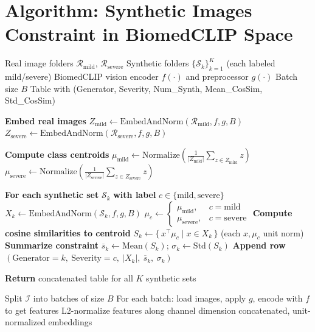 \documentclass[10pt]{article}
\begin{document}
\section*{Algorithm: Synthetic Images Constraint in BiomedCLIP Space}

\begin{algorithm}[H]
\caption{Compute class–centroid cosine similarity statistics (constraint)}
\begin{small}
\begin{algorithmic}[1]
\Require Real image folders $\mathcal{R}_{\text{mild}}$, $\mathcal{R}_{\text{severe}}$
\Require Synthetic folders $\{\mathcal{S}_k\}_{k=1}^K$ (each labeled mild/severe)
\Require BiomedCLIP vision encoder $f(\cdot)$ and preprocessor $g(\cdot)$
\Require Batch size $B$
\Ensure Table with (Generator, Severity, Num\_Synth, Mean\_CosSim, Std\_CosSim)

\State \textbf{Embed real images}
\State $Z_{\text{mild}} \gets \text{EmbedAndNorm}(\mathcal{R}_{\text{mild}}, f, g, B)$
\State $Z_{\text{severe}} \gets \text{EmbedAndNorm}(\mathcal{R}_{\text{severe}}, f, g, B)$

\State \textbf{Compute class centroids}
\State $\mu_{\text{mild}} \gets \text{Normalize}\!\left(\frac{1}{|Z_{\text{mild}}|}\sum_{z \in Z_{\text{mild}}} z\right)$
\State $\mu_{\text{severe}} \gets \text{Normalize}\!\left(\frac{1}{|Z_{\text{severe}}|}\sum_{z \in Z_{\text{severe}}} z\right)$

\State \textbf{For each synthetic set} $\mathcal{S}_k$ \textbf{with label} $c \in \{\text{mild},\text{severe}\}$
\State \quad $X_k \gets \text{EmbedAndNorm}(\mathcal{S}_k, f, g, B)$
\State \quad $\mu_c \gets \begin{cases}
\mu_{\text{mild}}, & c=\text{mild}\\
\mu_{\text{severe}}, & c=\text{severe}
\end{cases}$
\State \quad \textbf{Compute cosine similarities to centroid}
\State \quad $S_k \gets \{\, x^\top \mu_c \;|\; x \in X_k \,\}$ \hfill (each $x,\mu_c$ unit norm)
\State \quad \textbf{Summarize constraint}
\State \quad $\overline{s}_k \gets \text{Mean}(S_k)$; \; $\sigma_k \gets \text{Std}(S_k)$
\State \quad \textbf{Append row} $(\text{Generator}=k,\ \text{Severity}=c,\ |X_k|,\ \overline{s}_k,\ \sigma_k)$

\State \textbf{Return} concatenated table for all $K$ synthetic sets

  \State Split $\mathcal{I}$ into batches of size $B$
  \State For each batch: load images, apply $g$, encode with $f$ to get features
  \State L2-normalize features along channel dimension
  \State \Return concatenated, unit-normalized embeddings
\EndFunction

\end{algorithmic}
\end{small}
\end{algorithm}
\end{document}
